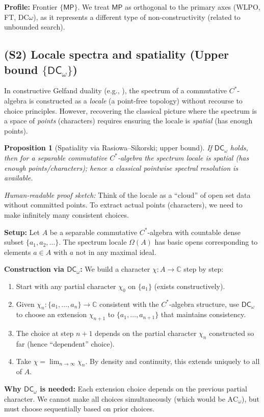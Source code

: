 \documentclass[11pt]{article}
\newcommand{\DCw}{\mathsf{DC}_{\omega}}
\newcommand{\MP}{\mathsf{MP}}
\newcommand{\leanok}{\text{\tiny [✓ Lean]}}
\theoremstyle{plain}
\newtheorem{proposition}[theorem]{Proposition}
\theoremstyle{definition}
\theoremstyle{remark}
\newenvironment{hrproof}{\noindent\textit{Human-readable proof sketch:} }{}
\newcommand{\C}{\mathbb{C}}
\newcommand{\ACw}{\mathrm{AC}_\omega}
\begin{document}
\noindent\textbf{Profile:} Frontier $\{\MP\}$. We treat $\MP$ as orthogonal to the primary axes (WLPO, FT, DC$\omega$), as it represents a different type of non-constructivity (related to unbounded search).

\subsection{(S2) Locale spectra and spatiality (Upper bound $\{\DCw\}$)} \leanok

In constructive Gelfand duality (e.g., \cite{CoquandSpitters}), the spectrum of a commutative $C^*$-algebra is constructed as a \emph{locale} (a point-free topology) without recourse to choice principles. However, recovering the classical picture where the spectrum is a space of \emph{points} (characters) requires ensuring the locale is \emph{spatial} (has enough points).

\begin{proposition}[Spatiality via Rasiowa--Sikorski; upper bound] \leanok
If $\DCw$ holds, then for a \emph{separable} commutative $C^*$-algebra the spectrum locale is spatial (has enough points/characters); hence a classical pointwise spectral resolution is available.
\end{proposition}

\begin{hrproof}
Think of the locale as a ``cloud'' of open set data without committed points. To extract actual points (characters), we need to make infinitely many consistent choices. 

\textbf{Setup:} Let $A$ be a separable commutative $C^*$-algebra with countable dense subset $\{a_1, a_2, \ldots\}$.
The spectrum locale $\Omega(A)$ has basic opens corresponding to elements $a \in A$ with $a$ not in any maximal ideal.

\textbf{Construction via $\DCw$:} 
We build a character $\chi: A \to \C$ step by step:
\begin{enumerate}
\item Start with any partial character $\chi_0$ on $\{a_1\}$ (exists constructively).
\item Given $\chi_n: \{a_1, \ldots, a_n\} \to \C$ consistent with the $C^*$-algebra structure, use $\DCw$ to choose an extension $\chi_{n+1}$ to $\{a_1, \ldots, a_{n+1}\}$ that maintains consistency.
\item The choice at step $n+1$ depends on the partial character $\chi_n$ constructed so far (hence ``dependent'' choice).
\item Take $\chi = \lim_{n \to \infty} \chi_n$. By density and continuity, this extends uniquely to all of $A$.
\end{enumerate}

\textbf{Why $\DCw$ is needed:} Each extension choice depends on the previous partial character. We cannot make all choices simultaneously (which would be $\ACw$), but must choose sequentially based on prior choices.
\end{hrproof}
\end{document}
